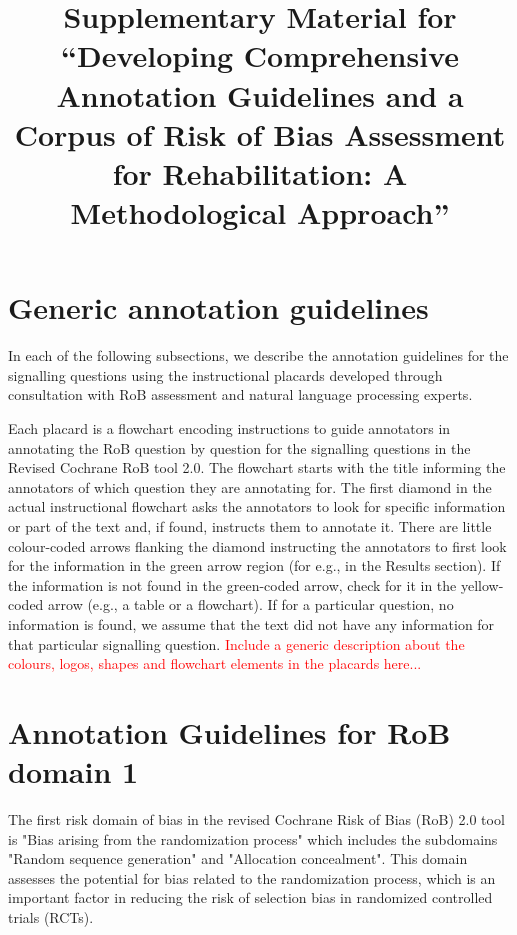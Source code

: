\documentclass[sn-mathphys,Numbered]{sn-jnl}%
\begin{document}
\title[Article Title]{Supplementary Material for ``Developing Comprehensive Annotation Guidelines and a Corpus of Risk of Bias Assessment for Rehabilitation: A Methodological Approach''}



\maketitle


\section*{Generic annotation guidelines}
\label{sec:generic}
%
In each of the following subsections, we describe the annotation guidelines for the signalling questions using the instructional placards developed through consultation with RoB assessment and natural language processing experts.

Each placard is a flowchart encoding instructions to guide annotators in annotating the RoB question by question for the signalling questions in the Revised Cochrane RoB tool 2.0.
The flowchart starts with the title informing the annotators of which question they are annotating for.
The first diamond in the actual instructional flowchart asks the annotators to look for specific information or part of the text and, if found, instructs them to annotate it.
There are little colour-coded arrows flanking the diamond instructing the annotators to first look for the information in the green arrow region (for e.g., in the Results section). 
If the information is not found in the green-coded arrow, check for it in the yellow-coded arrow (e.g., a table or a flowchart).
If for a particular question, no information is found, we assume that the text did not have any information for that particular signalling question.
\textcolor{red}{Include a generic description about the colours, logos, shapes and flowchart elements in the placards here...}
%
%
%
\section*{Annotation Guidelines for RoB domain 1}
\label{sec:dom1}
%
The first risk domain of bias in the revised Cochrane Risk of Bias (RoB) 2.0 tool is "Bias arising from the randomization process" which includes the subdomains "Random sequence generation" and "Allocation concealment". This domain assesses the potential for bias related to the randomization process, which is an important factor in reducing the risk of selection bias in randomized controlled trials (RCTs).
%
%
%
\end{document}
